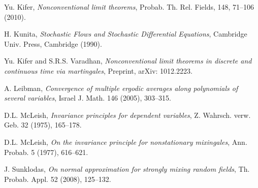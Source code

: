 \begin{thebibliography}{Bow75}
Yu. Kifer, {\em Nonconventional limit theorems}, Probab. Th. Rel. Fields,
148, 71--106 (2010).

 H. Kunita, {\em Stochastic Flows and Stochastic Differential 
Equations}, Cambridge Univ. Press, Cambridge (1990).

Yu. Kifer and S.R.S. Varadhan, {\em Nonconventional limit theorems in
discrete and continuous time via martingales}, Preprint, arXiv: 1012.2223.

A. Leibman, {\em Convergence of multiple ergodic averages along polynomials
of several variables}, Israel J. Math. 146 (2005), 303--315.

D.L. McLeish, {\em Invariance principles for dependent variables}, Z.
Wahrsch. verw. Geb. 32 (1975), 165--178.

D.L. McLeish, {\em On the invariance principle for nonstationary mixingales},
Ann. Probab. 5 (1977), 616--621.

J. Sunklodas, {\em On normal approximation for strongly mixing random fields},
Th. Probab. Appl. 52 (2008), 125--132.

\end{thebibliography}



